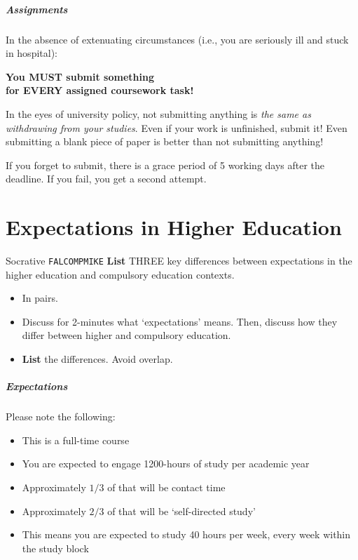 \begin{frame}
	\frametitle{Assignments}
		
	In the absence of extenuating circumstances (i.e., you are seriously ill and stuck in hospital):
	
	\begin{Large}
		\begin{center}
			\textbf{You MUST submit something \\ for EVERY assigned coursework task!}
		\end{center}
	\end{Large}
	
	In the eyes of university policy, not submitting anything is \textit{the same as withdrawing from your studies}. Even if your work is unfinished, submit it! Even submitting a blank piece of paper is better than not submitting anything! 
	
		\vspace{0.5em}
	
	If you forget to submit, there is a grace period of 5 working days after the deadline. If you fail, you get a second attempt.
	
\end{frame}


\part{Expectations in Higher Education}
\frame{\partpage}

\begin{frame}{Socrative \texttt{FALCOMPMIKE}}
	\textbf{List} THREE key differences between expectations in the higher education and compulsory education contexts.
	
	\begin{itemize}
		\item In pairs.
		\item Discuss for 2-minutes what `expectations' means. Then, discuss how they differ between higher and compulsory education.
		\item \textbf{List} the differences. Avoid overlap.
	\end{itemize}
\end{frame}

\begin{frame}
	\frametitle{Expectations}
	
	Please note the following:
	
	\begin{itemize}
		\item This is a full-time course
		\item You are expected to engage 1200-hours of study per academic year
		\item Approximately $1/3$ of that will be contact time
		\item Approximately $2/3$ of that will be `self-directed study'
		\item This means you are expected to study 40 hours per week, every week within the study block
	\end{itemize}

\end{frame}

